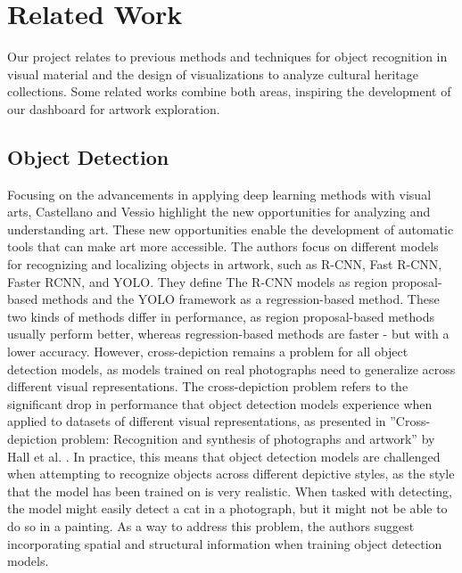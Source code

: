 \section{Related Work}
Our project relates to previous methods and techniques for object recognition in visual material and the design of visualizations to analyze cultural heritage collections. Some related works combine both areas, inspiring the development of our dashboard for artwork exploration.

\subsection{Object Detection}
Focusing on the advancements in applying deep learning methods with visual arts, Castellano and Vessio \cite{castellano2021} highlight the new opportunities for analyzing and understanding art. These new opportunities enable the development of automatic tools that can make art more accessible. The authors focus on different models for recognizing and localizing objects in artwork, such as R-CNN, Fast R-CNN, Faster RCNN, and YOLO. They define The R-CNN models as region proposal-based methods and the YOLO framework as a regression-based method. These two kinds of methods differ in performance, as region proposal-based methods usually perform better, whereas regression-based methods are faster - but with a lower accuracy. However, cross-depiction remains a problem for all object detection models, as models trained on real photographs need to generalize across different visual representations. The cross-depiction problem refers to the significant drop in performance that object detection models experience when applied to datasets of different visual representations, as presented in ”Cross-depiction problem: Recognition and synthesis of photographs and artwork” by Hall et al. \cite{hall2015}. In practice, this means that object detection models are challenged when attempting to recognize objects across different depictive styles, as the style that the model has been trained on is very realistic. When tasked with detecting, the model might easily detect a cat in a photograph, but it might not be able to do so in a painting. As a way to address this problem, the authors suggest incorporating spatial and structural information when training object detection models.


